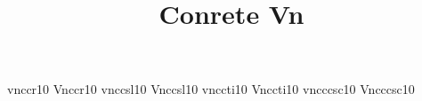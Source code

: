 \documentclass[test]{vnsample}
\title{Conrete Vn}
\begin{document}
\begin{shortsample}
   {vnccr10}   {Vnccr10}
  {vnccsl10}  {Vnccsl10}
  {vnccti10}  {Vnccti10}
  {vncccsc10} {Vncccsc10}
\end{shortsample}
\end{document}
